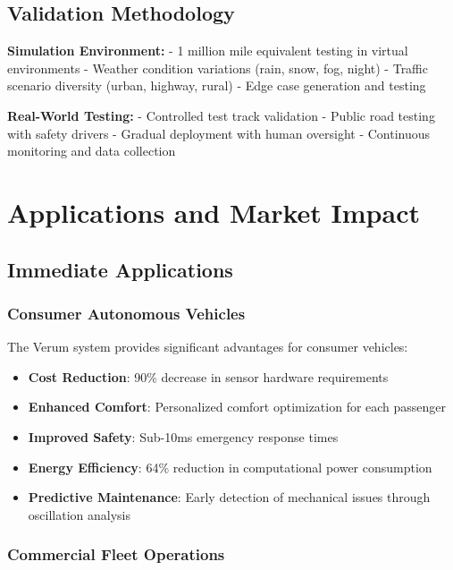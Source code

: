 \documentclass[11pt,a4paper]{article}
\begin{document}
\subsection{Validation Methodology}

\textbf{Simulation Environment:}
- 1 million mile equivalent testing in virtual environments
- Weather condition variations (rain, snow, fog, night)
- Traffic scenario diversity (urban, highway, rural)
- Edge case generation and testing

\textbf{Real-World Testing:}
- Controlled test track validation
- Public road testing with safety drivers
- Gradual deployment with human oversight
- Continuous monitoring and data collection

\section{Applications and Market Impact}

\subsection{Immediate Applications}

\subsubsection{Consumer Autonomous Vehicles}

The Verum system provides significant advantages for consumer vehicles:

\begin{itemize}
    \item \textbf{Cost Reduction}: 90\% decrease in sensor hardware requirements
    \item \textbf{Enhanced Comfort}: Personalized comfort optimization for each passenger
    \item \textbf{Improved Safety}: Sub-10ms emergency response times
    \item \textbf{Energy Efficiency}: 64\% reduction in computational power consumption
    \item \textbf{Predictive Maintenance}: Early detection of mechanical issues through oscillation analysis
\end{itemize}

\subsubsection{Commercial Fleet Operations}
\end{document}
